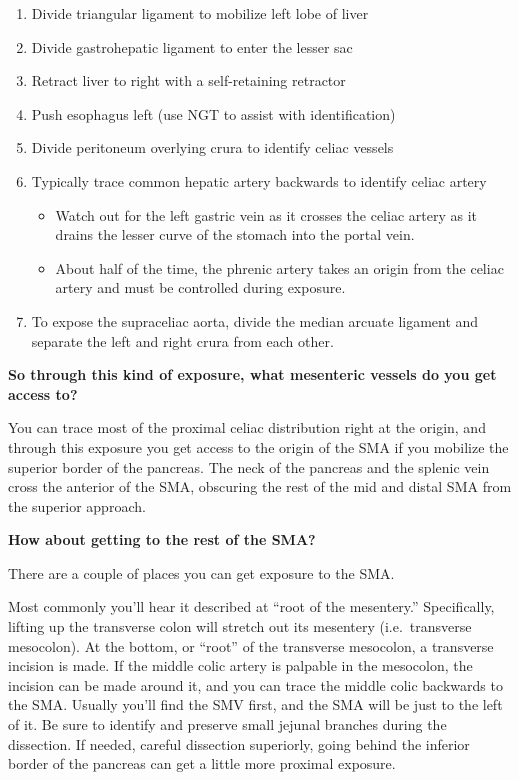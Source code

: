 \documentclass[
]{book}
\begin{document}
\begin{enumerate}
\def\labelenumi{\arabic{enumi}.}
\item
  Divide triangular ligament to mobilize left lobe of liver
\item
  Divide gastrohepatic ligament to enter the lesser sac~
\item
  Retract liver to right with a self-retaining retractor
\item
  Push esophagus left (use NGT to assist with identification)
\item
  Divide peritoneum overlying crura to identify celiac vessels
\item
  Typically trace common hepatic artery backwards to identify celiac
  artery

  \begin{itemize}
  \item
    Watch out for the left gastric vein as it crosses the celiac
    artery as it drains the lesser curve of the stomach into the
    portal vein.
  \item
    About half of the time, the phrenic artery takes an origin from
    the celiac artery and must be controlled during exposure.
  \end{itemize}
\item
  To expose the supraceliac aorta, divide the median arcuate ligament
  and separate the left and right crura from each other.
\end{enumerate}

\textbf{So through this kind of exposure, what mesenteric vessels do you get
access to?}

You can trace most of the proximal celiac distribution right at the
origin, and through this exposure you get access to the origin of the
SMA if you mobilize the superior border of the pancreas. The neck of the
pancreas and the splenic vein cross the anterior of the SMA, obscuring
the rest of the mid and distal SMA from the superior approach.

\textbf{How about getting to the rest of the SMA?}

There are a couple of places you can get exposure to the SMA.~

Most commonly you'll hear it described at ``root of the mesentery.''
Specifically, lifting up the transverse colon will stretch out its
mesentery (i.e.~transverse mesocolon). At the bottom, or ``root'' of the
transverse mesocolon, a transverse incision is made. If the middle colic
artery is palpable in the mesocolon, the incision can be made around it,
and you can trace the middle colic backwards to the SMA. Usually you'll
find the SMV first, and the SMA will be just to the left of it. Be sure
to identify and preserve small jejunal branches during the dissection.
If needed, careful dissection superiorly, going behind the inferior
border of the pancreas can get a little more proximal exposure.
\end{document}
